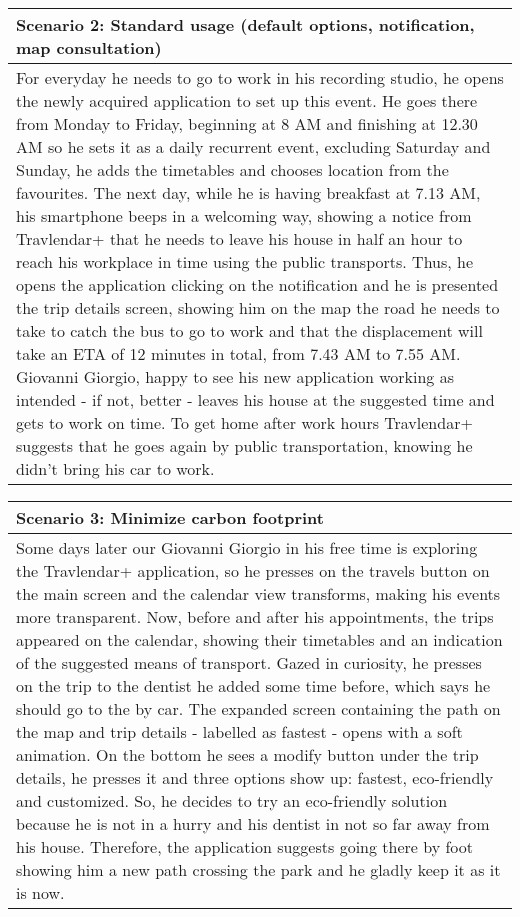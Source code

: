 \pagebreak
%
\begin{center}
\def\arraystretch{1.5}
  \begin{tabular}{ | p{} | }
    \hline
    Scenario 2: Standard usage (default options, notification, map consultation) \\ \hline
    For everyday he needs to go to work in his recording studio, he opens the newly acquired application to set up this event. He goes there from Monday to Friday, beginning at 8 AM and finishing at 12.30 AM so he sets it as a daily recurrent event, excluding Saturday and Sunday, he adds the timetables and chooses location from the favourites. The next day, while he is having breakfast at 7.13 AM, his smartphone beeps in a welcoming way, showing a notice from Travlendar+ that he needs to leave his house in half an hour to reach his workplace in time using the public transports. Thus, he opens the application clicking on the notification and he is presented the trip details screen, showing him on the map the road he needs to take to catch the bus to go to work and that the displacement will take an ETA of 12 minutes in total, from 7.43 AM to 7.55 AM. Giovanni Giorgio, happy to see his new application working as intended - if not, better - leaves his house at the suggested time and gets to work on time. To get home after work hours Travlendar+ suggests that he goes again by public transportation, knowing he didn’t bring his car to work. \\ \hline
  \end{tabular}
\end{center}
%
\begin{center}
\def\arraystretch{1.5}
  \begin{tabular}{ | p{} | }
    \hline
    Scenario 3: Minimize carbon footprint \\ \hline
    Some days later our Giovanni Giorgio in his free time is exploring the Travlendar+ application, so he presses on the travels button on the main screen and the calendar view transforms, making his events more transparent. Now, before and after his appointments, the trips appeared on the calendar, showing their timetables and an indication of the suggested means of transport. Gazed in curiosity, he presses on the trip to the dentist he added some time before, which says he should go to the by car. The expanded screen containing the path on the map and trip details - labelled as fastest - opens with a soft animation. On the bottom he sees a modify button under the trip details, he presses it and three options show up: fastest, eco-friendly and customized. So, he decides to try an eco-friendly solution because he is not in a hurry and his dentist in not so far away from his house. Therefore, the application suggests going there by foot showing him a new path crossing the park and he gladly keep it as it is now. \\ \hline
  \end{tabular}
\end{center}
